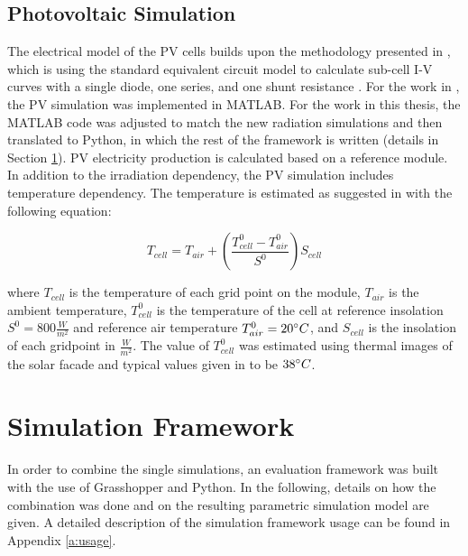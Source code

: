 		\subsection{Photovoltaic Simulation}
			The electrical model of the PV cells builds upon the methodology presented in \cite{hofer2016}, which is using the standard equivalent circuit model to calculate sub-cell I-V curves with a single diode, one series, and one shunt resistance \cite{mermoud2010}. For the work in \cite{hofer2016}, the PV simulation was implemented in MATLAB. For the work in this thesis, the MATLAB code was adjusted to match the new radiation simulations and then translated to Python, in which the rest of the framework is written (details in Section \ref{s:simulationFramework}). PV electricity production is calculated based on a reference module. In addition to the irradiation dependency, the PV simulation includes temperature dependency. The temperature is estimated as suggested in \cite{Ross_Smokler_1986} with the following equation:

			\begin{equation}
				T_{cell} = T_{air} + \left(\frac{T_{cell}^0-T_{air}^0}{S^0}\right)S_{cell}
	      		\label{e:temp}
			\end{equation}

			where $T_{cell}$ is the temperature of each grid point on the module, $T_{air}$ is the ambient temperature, $T_{cell}^0$ is the temperature of the cell at reference insolation $S^0=800\frac{W}{m^2}$ and reference air temperature $T_{air}^0=20\degree C$, and $S_{cell}$ is the insolation of each gridpoint in $\frac{W}{m^2}$. The value of $T_{cell}^0$ was estimated using thermal images of the solar facade and typical values given in \cite{Ross_Smokler_1986} to be $38\degree C$. 



	\section{Simulation Framework}
	\label{s:simulationFramework}
		In order to combine the single simulations, an evaluation framework was built with the use of Grasshopper and Python. In the following, details on how the combination was done and on the resulting parametric simulation model are given. A detailed description of the simulation framework usage can be found in Appendix \ref{a:usage}. 

